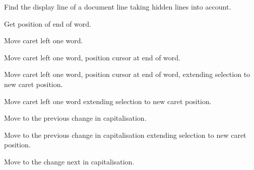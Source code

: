
Find the display line of a document line taking hidden lines into account.


\label{wxstyledtextctrlwordendposition}


Get position of end of word.


\label{wxstyledtextctrlwordleft}


Move caret left one word.


\label{wxstyledtextctrlwordleftend}


Move caret left one word, position cursor at end of word.


\label{wxstyledtextctrlwordleftendextend}


Move caret left one word, position cursor at end of word, extending selection to new caret position.


\label{wxstyledtextctrlwordleftextend}


Move caret left one word extending selection to new caret position.


\label{wxstyledtextctrlwordpartleft}


Move to the previous change in capitalisation.


\label{wxstyledtextctrlwordpartleftextend}


Move to the previous change in capitalisation extending selection
to new caret position.


\label{wxstyledtextctrlwordpartright}


Move to the change next in capitalisation.


